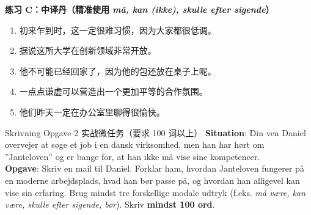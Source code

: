 \textbf{练习 C：中译丹（精准使用 \textit{må, kan (ikke), skulle efter sigende}）}
\begin{enumerate}
  \item 初来乍到时，这一定很难习惯，因为大家都很低调。
  \item 据说这所大学在创新领域非常开放。
  \item 他不可能已经回家了，因为他的包还放在桌子上呢。
  \item 一点点谦虚可以营造出一个更加平等的合作氛围。
  \item 他们昨天一定在办公室里聊得很愉快。
\end{enumerate}


\begin{emailbox}{Skrivning Opgave 2 实战微任务（要求 100 词以上）}
\textbf{Situation}: Din ven Daniel overvejer at søge et job i en dansk virksomhed, men han har hørt om ”Janteloven” og er bange for, at han ikke må vise sine kompetencer.\\
\textbf{Opgave}: Skriv en mail til Daniel. Forklar ham, hvordan Janteloven fungerer på en moderne arbejdsplads, hvad han bør passe på, og hvordan han alligevel kan vise sin erfaring. Brug mindst tre forskellige modale udtryk (f.eks. \textit{må være, kan være, skulle efter sigende, bør}). Skriv \textbf{mindst 100 ord}.
\end{emailbox}

